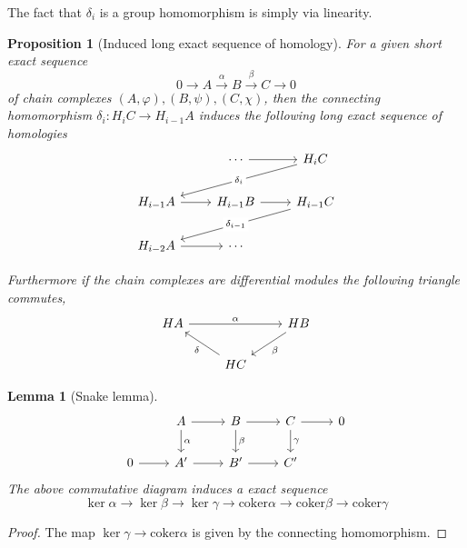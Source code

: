 \documentclass[12pt]{article}
\numberwithin{equation}{section}
\newcounter{dummy} \numberwithin{dummy}{section}
\newtheorem{lemma}[dummy]{Lemma}
\newtheorem{proposition}[dummy]{Proposition}
\begin{document}
	The fact that $\delta_i $ is a group homomorphism is simply via linearity.
	
	\begin{proposition}[Induced long exact sequence of homology]
		For a given short exact sequence 
		\[ 0 \to A \xrightarrow{\alpha } B \xrightarrow{\beta } C \to 0\]
		of chain complexes $(A, \varphi), (B, \psi), (C, \chi)$, then the connecting homomorphism $\delta_i: H_iC \to H_{i-1}A$ induces the following long exact sequence of homologies
		\[\begin{tikzcd}
			& \cdots & {H_iC} \\
			{H_{i-1}A} & {H_{i-1}B} & {H_{i-1}C} \\
			{H_{i-2}A} & \cdots
			\arrow[from=1-2, to=1-3]
			\arrow[from=2-1, to=2-2]
			\arrow[from=2-2, to=2-3]
			\arrow["{\delta_i}"{description}, from=1-3, to=2-1]
			\arrow["{\delta_{i-1}}"{description}, from=2-3, to=3-1]
			\arrow[from=3-1, to=3-2]
		\end{tikzcd}\]
		
		Furthermore if the chain complexes are differential modules the following triangle commutes,
		\[\begin{tikzcd}
			HA && HB \\
			& HC
			\arrow["\alpha", from=1-1, to=1-3]
			\arrow["\beta", from=1-3, to=2-2]
			\arrow["\delta", from=2-2, to=1-1]
		\end{tikzcd}\]
		
	\end{proposition}
	
	\begin{lemma}[Snake lemma]
		\[\begin{tikzcd}
			& A & B & C & 0 \\
			0 & {A'} & {B'} & {C'}
			\arrow[from=1-2, to=1-3]
			\arrow[from=1-3, to=1-4]
			\arrow[from=1-4, to=1-5]
			\arrow[from=2-1, to=2-2]
			\arrow[from=2-2, to=2-3]
			\arrow[from=2-3, to=2-4]
			\arrow["\alpha", from=1-2, to=2-2]
			\arrow["\beta", from=1-3, to=2-3]
			\arrow["\gamma", from=1-4, to=2-4]
		\end{tikzcd}\]
		The above commutative diagram induces a exact sequence \[ \ker \alpha \to \ker \beta \to \ker \gamma \to \mathrm{coker}\alpha \to \mathrm{coker}\beta \to \mathrm{coker}\gamma \]
	\end{lemma}
	\begin{proof}
		The map $\ker \gamma \to \mathrm{coker} \alpha $ is given by the connecting homomorphism.
	\end{proof}
	
\end{document}
